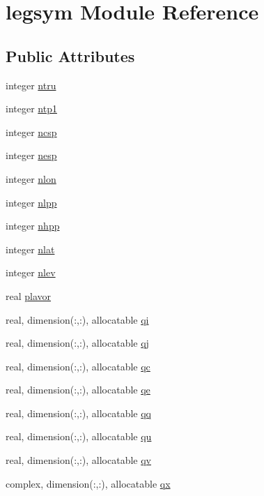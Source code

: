 \hypertarget{classlegsym}{
\section{legsym \-Module \-Reference}
\label{classlegsym}
}
\subsection*{\-Public \-Attributes}
\begin{DoxyCompactItemize}
\item 
integer \hyperlink{classlegsym_a9f44e2174fc92267b46632e481acce37}{ntru}
\item 
integer \hyperlink{classlegsym_a3de2526b7367430bf2925e4d9e293b8d}{ntp1}
\item 
integer \hyperlink{classlegsym_a1cc07c984867c3dc3b122ac8fce446e2}{ncsp}
\item 
integer \hyperlink{classlegsym_a8d1597f9974455b1abb4b57e34a77625}{nesp}
\item 
integer \hyperlink{classlegsym_adc6b16f2626e9dcb618d2d950e2db17a}{nlon}
\item 
integer \hyperlink{classlegsym_a296b840ee1daf32583f78f3b8136acb0}{nlpp}
\item 
integer \hyperlink{classlegsym_a2ca038107ed480d5443db9a2f0322ce1}{nhpp}
\item 
integer \hyperlink{classlegsym_a48c28c34fad8572472b4994bf99da184}{nlat}
\item 
integer \hyperlink{classlegsym_a8b4c67467362c9d324d5ad7bf5b6e78e}{nlev}
\item 
real \hyperlink{classlegsym_adb777017fc0833c5be3bbe40fb789d9f}{plavor}
\item 
real, dimension(\-:,\-:), allocatable \hyperlink{classlegsym_a35897a5a32d0ac4f7193e2c6df059430}{qi}
\item 
real, dimension(\-:,\-:), allocatable \hyperlink{classlegsym_a3fd3514e19855e9c94debeb13d1c0a3c}{qj}
\item 
real, dimension(\-:,\-:), allocatable \hyperlink{classlegsym_a8da266cccc13b41ffb15d593f3cfbda1}{qc}
\item 
real, dimension(\-:,\-:), allocatable \hyperlink{classlegsym_a27a404e273f903a7a9fa790dd2440605}{qe}
\item 
real, dimension(\-:,\-:), allocatable \hyperlink{classlegsym_ae957dbe2cb8c53bef3e92d64bbea2785}{qq}
\item 
real, dimension(\-:,\-:), allocatable \hyperlink{classlegsym_a9e9b5d567f315f6cf660a0b44ffb4889}{qu}
\item 
real, dimension(\-:,\-:), allocatable \hyperlink{classlegsym_a9a8f54ece20fd3aacb5d1f1570450ee0}{qv}
\item 
complex, dimension(\-:,\-:), \*
allocatable \hyperlink{classlegsym_aff59025facb5c5b3d3717ca32328f587}{qx}
\end{DoxyCompactItemize}


